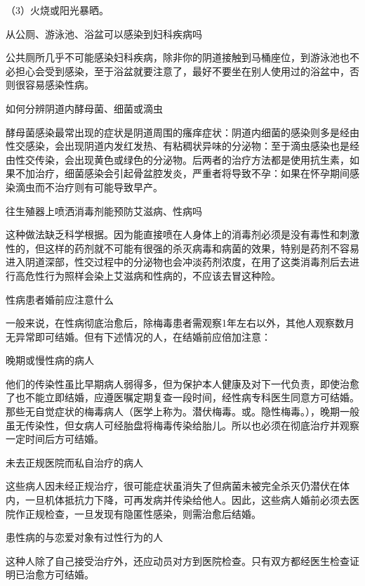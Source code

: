 \documentclass[12pt,UTF8,openany]{ctexbook}
\begin{document}
（3）火烧或阳光暴晒。





从公厕、游泳池、浴盆可以感染到妇科疾病吗


公共厕所几乎不可能感染妇科疾病，除非你的阴道接触到马桶座位，到游泳池也不必担心会受到感染，至于浴盆就要注意了，最好不要坐在别人使用过的浴盆中，否则很容易感染性病。





如何分辨阴道内酵母菌、细菌或滴虫


酵母菌感染最常出现的症状是阴道周围的瘙痒症状：阴道内细菌的感染则多是经由性交感染，会出现阴道内发红发热、有粘稠状异味的分泌物：至于滴虫感染也是经由性交传染，会出现黄色或绿色的分泌物。后两者的治疗方法都是使用抗生素，如果不加治疗，细菌感染会引起骨盆腔发炎，严重者将导致不孕：如果在怀孕期间感染滴虫而不治疗则有可能导致早产。





往生殖器上喷洒消毒剂能预防艾滋病、性病吗


这种做法缺乏科学根据。因为能直接喷在人身体上的消毒剂必须是没有毒性和刺激性的，但这样的药剂就不可能有很强的杀灭病毒和病菌的效果，特别是药剂不容易进入阴道深部，性交过程中的分泌物也会冲淡药剂浓度，在用了这类消毒剂后去进行高危性行为照样会染上艾滋病和性病的，不应该去冒这种险。





性病患者婚前应注意什么


一般来说，在性病彻底治愈后，除梅毒患者需观察1年左右以外，其他人观察数月无异常即可结婚。但有下述情况的人，在结婚前应倍加注意：

晚期或慢性病的病人

他们的传染性虽比早期病人弱得多，但为保护本人健康及对下一代负责，即使治愈了也不能立即结婚，应遵医嘱定期复查一段时间，经性病专科医生同意方可结婚。那些无自觉症状的梅毒病人（医学上称为。潜伏梅毒。或。隐性梅毒。），晚期一般虽无传染性，但女病人可经胎盘将梅毒传染给胎儿。所以也必须在彻底治疗并观察一定时间后方可结婚。

未去正规医院而私自治疗的病人

这些病人因未经正规治疗，很可能症状虽消失了但病菌未被完全杀灭仍潜伏在体内，一旦机体抵抗力下降，可再发病并传染给他人。因此，这些病人婚前必须去医院作正规检查，一旦发现有隐匿性感染，则需治愈后结婚。

患性病的与恋爱对象有过性行为的人

这种人除了自己接受治疗外，还应动员对方到医院检查。只有双方都经医生检查证明已治愈方可结婚。
\end{document}
